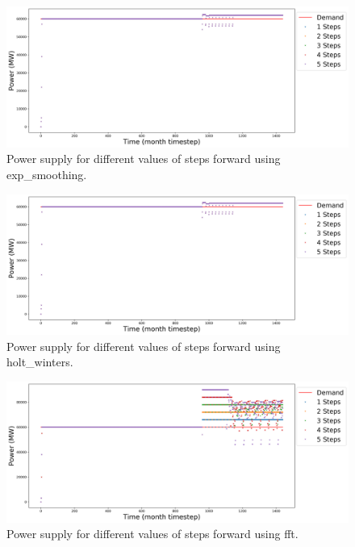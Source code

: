 \documentclass[11pt]{article}
\begin{document}
\begin{figure}[!h]
	\centering
	\includegraphics[width=\textwidth]{23-figures/23-power-buffer0-exp_smoothing-steps.png} 
	\hfill
	\caption{Power supply for different values of steps forward using exp\_smoothing.}
	\label{fig:23-ste-exp_smoothing}
\end{figure}

\begin{figure}[!h]
	\centering
	\includegraphics[width=\textwidth]{23-figures/23-power-buffer0-holt_winters-steps.png} 
	\hfill
	\caption{Power supply for different values of steps forward using holt\_winters.}
	\label{fig:23-ste-hots_winters}
\end{figure}

\begin{figure}[!h]
	\centering
	\includegraphics[width=\textwidth]{23-figures/23-power-buffer0-fft-steps.png} 
	\hfill
	\caption{Power supply for different values of steps forward using fft.}
	\label{fig:23-ste-fft}
\end{figure}
\end{document}
